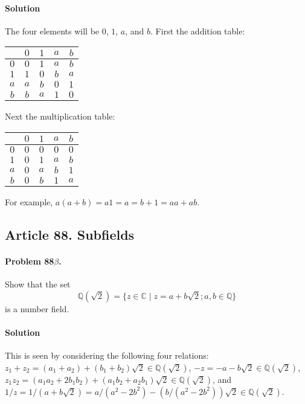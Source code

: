 \paragraph*{Solution}
The four elements will be $0$, $1$, $a$, and $b$. First the addition table:

\begin{center}
\begin{tabular}{c|cccc}
    & $0$ & $1$ & $a$ & $b$ \\
\hline
$0$ & $0$ & $1$ & $a$ & $b$ \\
$1$ & $1$ & $0$ & $b$ & $a$ \\
$a$ & $a$ & $b$ & $0$ & $1$ \\
$b$ & $b$ & $a$ & $1$ & $0$
\end{tabular}
\end{center}

Next the multiplication table:

\begin{center}
\begin{tabular}{c|cccc}
    & $0$ & $1$ & $a$ & $b$ \\
\hline
$0$ & $0$ & $0$ & $0$ & $0$ \\
$1$ & $0$ & $1$ & $a$ & $b$ \\
$a$ & $0$ & $a$ & $b$ & $1$ \\
$b$ & $0$ & $b$ & $1$ & $a$
\end{tabular}
\end{center}

For example, $a(a+b) = a1 = a = b+1 = aa + ab$.
\subsection{Article 88. Subfields}

\paragraph{Problem 88$\beta$.}
Show that the set
$$\mathbb{Q}(\sqrt{2}) = \{ z \in \mathbb{C} \mid z = a + b \sqrt{2} ;
a, b \in \mathbb{Q} \} $$
is a number field.

\paragraph{Solution}
This is seen by considering the following four relations:
$ z_1 + z_2 = (a_1 + a_2) + (b_1 + b_2)\sqrt{2} \in \mathbb{Q}(\sqrt{2}) $,
$ -z = -a - b\sqrt{2} \in \mathbb{Q}(\sqrt{2}) $,
$ z_1 z_2 = (a_1 a_2 + 2 b_1 b_2) + (a_1 b_2 + a_2 b_1) \sqrt{2} \in \mathbb{Q}(\sqrt{2}) $,
and $ 1/z = 1 / (a + b\sqrt{2}) = a/(a^2 - 2 b^2) - (b/(a^2 - 2 b^2))\sqrt{2} \in \mathbb{Q}(\sqrt{2}) $.


